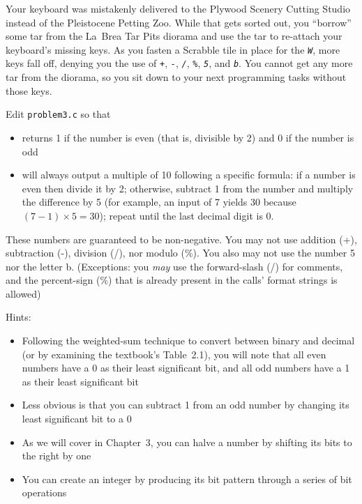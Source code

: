 Your keyboard was mistakenly delivered to the Plywood Scenery Cutting Studio instead of the Pleistocene Petting Zoo.
While that gets sorted out, you ``borrow'' some tar from the La~Brea Tar Pits diorama and use the tar to re-attach your keyboard's missing keys.
As you fasten a Scrabble tile in place for the \textit{\texttt{W}}, more keys fall off, denying you the use of \textit{\texttt{+}}, \textit{\texttt{-}}, \textit{\texttt{/}}, \textit{\texttt{\%}}, \textit{\texttt{5}}, and \textit{\texttt{b}}.
You cannot get any more tar from the diorama, so you sit down to your next programming tasks without those keys.

Edit \texttt{problem3.c} so that
\begin{itemize}
    \item {} returns 1 if the number is even (that is, divisible by 2) and 0 if the number is odd
    \item {} will always output a multiple of 10 following a specific formula: if a number is even then divide it by 2;
    otherwise, subtract 1 from the number and multiply the difference by 5 (for example, an input of 7 yields 30 because $(7-1) \times 5 = 30$);
    repeat until the last decimal digit is 0.
\end{itemize}
These numbers are guaranteed to be non-negative.
You may not use addition (+), subtraction (-), division (/), nor modulo (\%).
You also may not use the number 5 nor the letter b.
(Exceptions: you \textit{may} use the forward-slash (/) for comments, and the percent-sign (\%) that is already present in the  calls' format strings is allowed)

Hints:
\begin{itemize}
    \item Following the weighted-sum technique to convert between binary and decimal (or by examining the textbook's Table~2.1), you will note that all even numbers have a 0 as their least significant bit, and all odd numbers have a 1 as their least significant bit
    \item Less obvious is that you can subtract 1 from an odd number by changing its least significant bit to a 0
    \item As we will cover in Chapter~3, you can halve a number by shifting its bits to the right by one
    \item You can create an integer by producing its bit pattern through a series of bit operations
\end{itemize}

